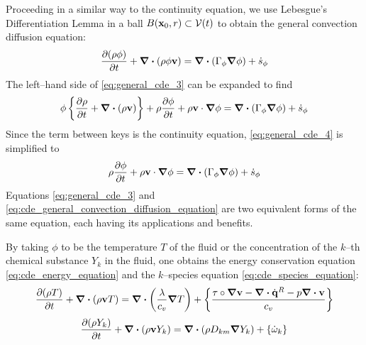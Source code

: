 Proceeding in a similar way to the continuity equation, we use Lebesgue's Differentiation Lemma in a ball $B(\vb{x}_0, r) \subset {\mathcal{V}(t)}$ to obtain the general convection diffusion equation:
\begin{equation} \label{eq:general_cde_3}
	\pdv{(\rho \phi)}{t} + \div(\rho \phi \vb{v}) = 
	\div(\Gamma_\phi \grad{\phi}) + \dot{s}_\phi	
\end{equation}
The left--hand side of \eqref{eq:general_cde_3} can be expanded to find
\begin{equation} \label{eq:general_cde_4}
	\phi \left\{ \pdv{\rho}{t} + \div(\rho \vb{v}) \right\} + 
	\rho \pdv{\phi}{t} + \rho \vb{v} \cdot \grad{\phi} = 
	\div(\Gamma_\phi \grad{\phi}) + \dot{s}_\phi	
\end{equation}
Since the term between keys is the continuity equation, \eqref{eq:general_cde_4} is simplified to
\begin{equation} \label{eq:cde_general_convection_diffusion_equation}
	\rho \pdv{\phi}{t} + \rho \vb{v} \cdot \grad{\phi} = 
	\div(\Gamma_\phi \grad{\phi}) + \dot{s}_\phi	
\end{equation}
Equations \eqref{eq:general_cde_3} and \eqref{eq:cde_general_convection_diffusion_equation} are two equivalent forms of the same equation, each having its applications and benefits.

By taking $\phi$ to be the temperature $T$ of the fluid or the concentration of the $k$--th chemical substance $Y_k$ in the fluid, one obtains the energy conservation equation \eqref{eq:cde_energy_equation} and the $k$--species equation \eqref{eq:cde_species_equation}:
\begin{equation} \label{eq:cde_energy_equation}
	\pdv{(\rho T)}{t} + \div(\rho \vb{v} T) = 
	\div(\frac{\lambda}{c_v} \grad{T}) + 
	\left\{ \frac{\vb{\tau} \circ \grad{\vb{v}} - \div{\dot{\vb{q}}^R} - p \div{\vb{v}}}{c_v}\right\}
\end{equation}
\begin{equation} \label{eq:cde_species_equation}
	\pdv{(\rho Y_k)}{t} + \div(\rho \vb{v} Y_k) = 
	\div(\rho D_{km} \grad{Y_k}) + \left\{ \dot{\omega}_k \right\}
\end{equation}


